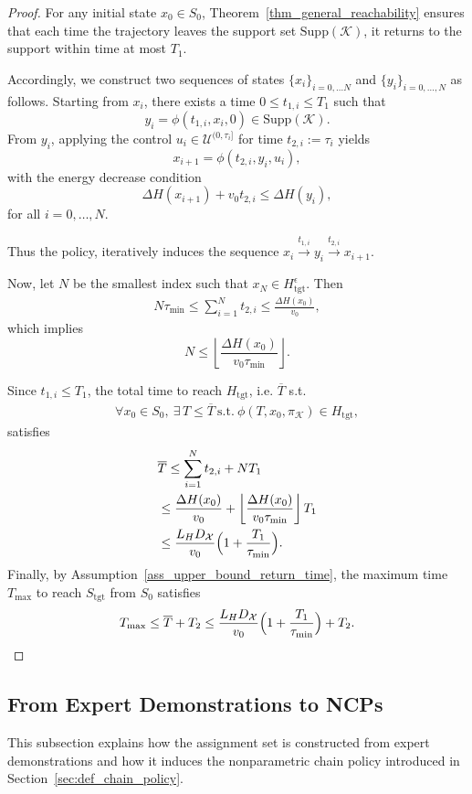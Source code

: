 \documentclass[letterpaper, 10 pt, conference]{ieeeconf}
\newcommand{\tgt}{\mathrm{tgt}}
\newcommand{\Supp}{\mathrm{Supp}}
\begin{document}
\begin{proof}
  For any initial state $x_0 \in S_0$, Theorem~\ref{thm_general_reachability} ensures that each time the trajectory leaves the support set $\Supp(\mathcal{K})$, it returns to the support within time at most $T_1$. 

Accordingly, we construct two sequences of states $\{x_i\}_{i=0,\dots N}$ and $\{y_i\}_{i=0,\dots, N}$ as follows. Starting from $x_i$, there exists a time $0 \le t_{1,i} \le T_1$ such that
\[
y_i = \phi(t_{1,i}, x_i, 0) \in \Supp(\mathcal{K}).
\]
From $y_i$, applying the control $u_i\in \mathcal{U}^{(0,\tau_i]}$ for time $t_{2,i}:=\tau_i$ yields
\[
x_{i+1} = \phi(t_{2,i}, y_i, u_i),
\]
with the energy decrease condition
\[
\Delta H(x_{i+1}) + v_0 t_{2,i} \le \Delta H(y_i),
\]
for all $i = 0,\dots,N$.

Thus the policy, iteratively induces the sequence $x_i\xrightarrow {t_{1,i}} y_i\xrightarrow {t_{2,i}} x_{i+1}$. 
    
Now, let $N$ be the smallest index such that $x_N \in H_{\tgt}^\epsilon$. Then
\begin{align*}
N\tau_{\min}\leq \sum_{i=1}^N t_{2,i}\leq \frac{\Delta H(x_0)}{v_{0}},
\end{align*}
which implies
\[
N\leq \left\lfloor \frac{\Delta H(x_0)}{v_{0}\tau_{\min}}\right\rfloor.
\]

Since $t_{1,i}\leq T_1$, the total time to reach $H_{\tgt}$, i.e. $\overline T$ s.t. 
\begin{align*}
\forall x_0\in S_0,\ \exists\, T\leq \overline{T}\ \mathrm{s.t.}\ \phi(T,x_0,\pi_{\mathcal{K}})\in H_{\tgt},
\end{align*}
satisfies 
\begin{align}
&\overline{T} \leq \sum_{i=1}^N t_{2,i}+NT_1\\
&\leq \frac{\Delta H(x_0)}{v_{0}} + \left\lfloor \frac{\Delta H(x_0)}{v_{0}\tau_{\min}}\right\rfloor T_1\\
&\leq \frac{L_{H}D_{\mathcal{X}}}{v_{0}}\Bigl(1+\frac{T_1}{\tau_{\min}}\Bigr).
\end{align}
Finally, by Assumption~\ref{ass_upper_bound_return_time}, the maximum time $T_{\max}$ to reach $S_{\tgt}$ from $S_0$ satisfies
\begin{align*}
T_{\max}\leq \overline{T}+T_2
\leq \frac{L_{H}D_{\mathcal{X}}}{v_{0}}\Bigl(1+\frac{T_1}{\tau_{\min}}\Bigr)+T_2.
\end{align*}
\end{proof}

\subsection{From Expert Demonstrations to NCPs}
\label{sec:alg}
This subsection explains how the assignment set is constructed from expert demonstrations and how it induces the nonparametric chain policy introduced in Section~\ref{sec:def_chain_policy}.
\end{document}
